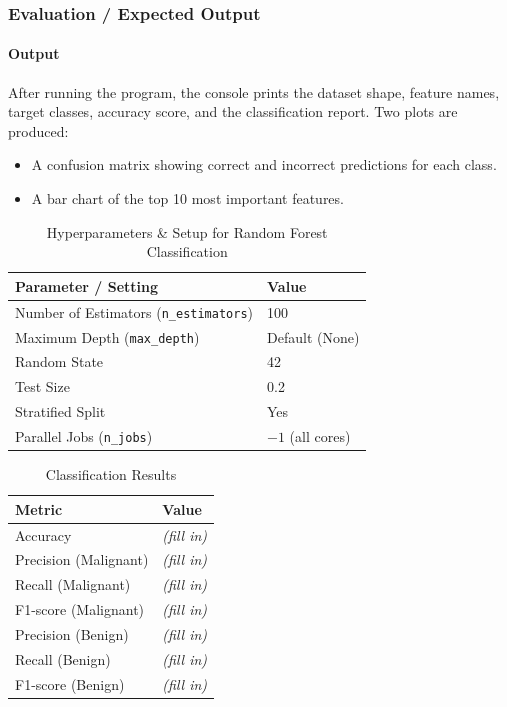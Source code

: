 \documentclass[a4paper,11pt]{article}
\begin{document}
\subsubsection{Evaluation / Expected Output}

\paragraph{Output}
After running the program, the console prints the dataset shape, feature names, target classes, accuracy score, and the classification report. Two plots are produced:
\begin{itemize}
    \item A confusion matrix showing correct and incorrect predictions for each class.
    \item A bar chart of the top 10 most important features.
\end{itemize}

\begin{table}[H]
\centering
\caption{Hyperparameters \& Setup for Random Forest Classification}
\begin{tabular}{ll}
\toprule
\textbf{Parameter / Setting} & \textbf{Value} \\
\midrule
Number of Estimators (\texttt{n\_estimators}) & 100 \\
Maximum Depth (\texttt{max\_depth})           & Default (None) \\
Random State                                   & 42 \\
Test Size                                      & 0.2 \\
Stratified Split                               & Yes \\
Parallel Jobs (\texttt{n\_jobs})               & $-1$ (all cores) \\
\bottomrule
\end{tabular}
\end{table}

\begin{table}[H]
\centering
\caption{Classification Results}
\begin{tabular}{ll}
\toprule
\textbf{Metric} & \textbf{Value} \\
\midrule
Accuracy         & \textit{(fill in)} \\
Precision (Malignant) & \textit{(fill in)} \\
Recall (Malignant)    & \textit{(fill in)} \\
F1-score (Malignant)  & \textit{(fill in)} \\
Precision (Benign)    & \textit{(fill in)} \\
Recall (Benign)       & \textit{(fill in)} \\
F1-score (Benign)     & \textit{(fill in)} \\
\bottomrule
\end{tabular}
\end{table}
\end{document}
